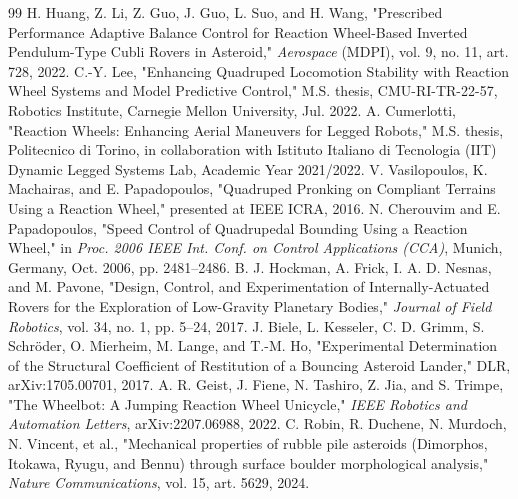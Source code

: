 \documentclass[conference]{IEEEtran}
\begin{document}
\begin{thebibliography}{99}
 H. Huang, Z. Li, Z. Guo, J. Guo, L. Suo, and H. Wang, "Prescribed Performance Adaptive Balance Control for Reaction Wheel-Based Inverted Pendulum-Type Cubli Rovers in Asteroid," \emph{Aerospace} (MDPI), vol. 9, no. 11, art. 728, 2022.
 C.-Y. Lee, "Enhancing Quadruped Locomotion Stability with Reaction Wheel Systems and Model Predictive Control," M.S. thesis, CMU-RI-TR-22-57, Robotics Institute, Carnegie Mellon University, Jul. 2022.
 A. Cumerlotti, "Reaction Wheels: Enhancing Aerial Maneuvers for Legged Robots," M.S. thesis, Politecnico di Torino, in collaboration with Istituto Italiano di Tecnologia (IIT) Dynamic Legged Systems Lab, Academic Year 2021/2022.
 V. Vasilopoulos, K. Machairas, and E. Papadopoulos, "Quadruped Pronking on Compliant Terrains Using a Reaction Wheel," presented at IEEE ICRA, 2016.
 N. Cherouvim and E. Papadopoulos, "Speed Control of Quadrupedal Bounding Using a Reaction Wheel," in \emph{Proc. 2006 IEEE Int. Conf. on Control Applications (CCA)}, Munich, Germany, Oct. 2006, pp. 2481--2486.
 B. J. Hockman, A. Frick, I. A. D. Nesnas, and M. Pavone, "Design, Control, and Experimentation of Internally-Actuated Rovers for the Exploration of Low-Gravity Planetary Bodies," \emph{Journal of Field Robotics}, vol. 34, no. 1, pp. 5--24, 2017.
 J. Biele, L. Kesseler, C. D. Grimm, S. Schr\"oder, O. Mierheim, M. Lange, and T.-M. Ho, "Experimental Determination of the Structural Coefficient of Restitution of a Bouncing Asteroid Lander," DLR, arXiv:1705.00701, 2017.
 A. R. Geist, J. Fiene, N. Tashiro, Z. Jia, and S. Trimpe, "The Wheelbot: A Jumping Reaction Wheel Unicycle," \emph{IEEE Robotics and Automation Letters}, arXiv:2207.06988, 2022.
 C. Robin, R. Duchene, N. Murdoch, N. Vincent, et al., "Mechanical properties of rubble pile asteroids (Dimorphos, Itokawa, Ryugu, and Bennu) through surface boulder morphological analysis," \emph{Nature Communications}, vol. 15, art. 5629, 2024.
\end{thebibliography}
\end{document}
